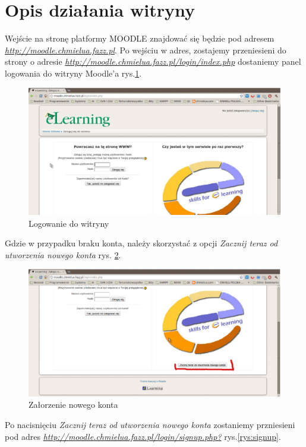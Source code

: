 \section{Opis działania witryny} \label{roz:opis}
Wejście na stronę platformy MOODLE znajdować się będzie pod adresem \\ \href{http://moodle.chmielua.fazz.pl}{\textit{http://moodle.chmielua.fazz.pl}}. Po wejściu w adres, zostajemy przeniesieni do strony o adresie \href{http://moodle.chmielua.fazz.pl/login/index.php}{\textit{http://moodle.chmielua.fazz.pl/login/index.php}} dostaniemy panel logowania do witryny Moodle'a rys.\ref{rys:login}. 
\begin{figure}[!h]
	\centering
		\caption{Logowanie do witryny} \label{rys:login}
		\includegraphics[width=1\textwidth]{projekt_sys//rys//logowanie.eps}
\end{figure}
Gdzie w przypadku braku konta, należy skorzystać z opcji \textit{Zacznij teraz od utworzenia nowego konta} rys. \ref{rys:nowy}.
\begin{figure}[!h]
	\centering
		\caption{Załorzenie nowego konta} \label{rys:nowy}
		\includegraphics[width=1\textwidth]{projekt_sys//rys//nowy_user.eps}
\end{figure}
Po nacisnięciu \textit{Zacznij teraz od utworzenia nowego konta} zostaniemy przniesieni pod adres \href{http://moodle.chmielua.fazz.pl/login/signup.php?}{\textit{http://moodle.chmielua.fazz.pl/login/signup.php?}} rys.\ref{rys:signup}.
